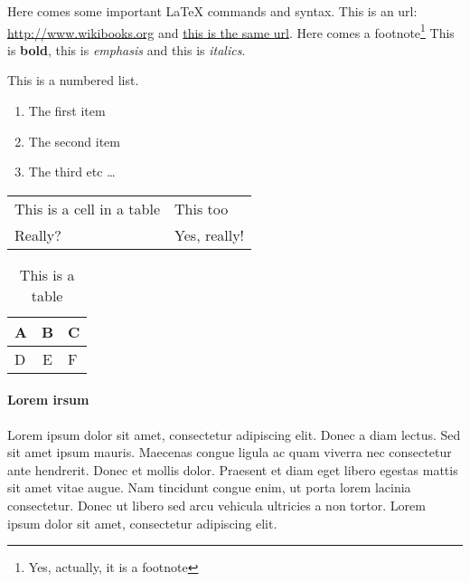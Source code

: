 

Here comes some important LaTeX commands and syntax.
This is an url: \url{http://www.wikibooks.org} and
\href{http://www.wikibooks.org}{this is the same url}.
Here comes a footnote\footnote{Yes, actually, it is a footnote}
This is \textbf{bold}, this is \emph{emphasis} and this is \textit{italics}.

This is a numbered list.
\begin{enumerate}
   \item The first item
   \item The second item
   \item The third etc \ldots
\end{enumerate}

\begin{tabular}{l l}
	This is a cell in a table & This too \\
	Really? & Yes, really! \\
\end{tabular}

\begin{table}[H] \center
    \begin{tabular}{| l | c | l |}
        \hline A & B & C \\
        \hline D & E & F \\ \hline
    \end{tabular}
    \caption{This is a table}
\end{table}

\paragraph{Lorem irsum}
Lorem ipsum dolor sit amet, consectetur adipiscing elit. Donec a diam lectus.
Sed sit amet ipsum mauris. Maecenas congue ligula ac quam viverra nec
consectetur ante hendrerit. Donec et mollis dolor. Praesent et diam eget
libero egestas mattis sit amet vitae augue. Nam tincidunt congue enim, ut
porta lorem lacinia consectetur. Donec ut libero sed arcu vehicula ultricies a
non tortor. Lorem ipsum dolor sit amet, consectetur adipiscing elit.


